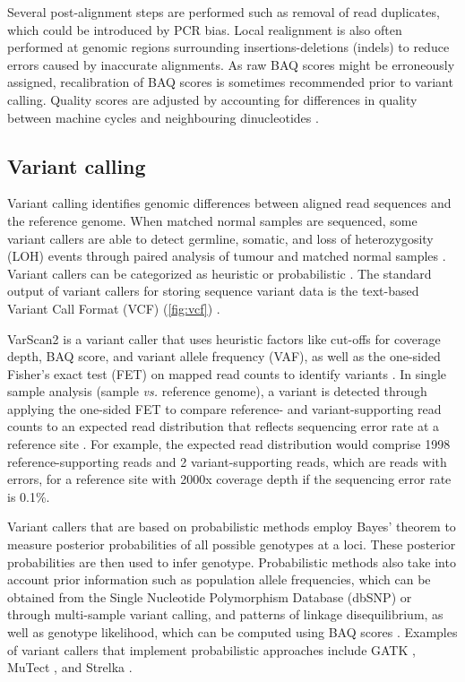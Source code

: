Several post-alignment steps are performed such as removal of read duplicates, which could be introduced by PCR bias. Local realignment is also often performed at genomic regions surrounding insertions-deletions (indels) to reduce errors caused by inaccurate alignments. As raw BAQ scores might be erroneously assigned, recalibration of BAQ scores is sometimes recommended prior to variant calling. Quality scores are adjusted by accounting for differences in quality between machine cycles and neighbouring dinucleotides \cite{Bao2014, Mielczarek2016, Nielsen2011a, Oliver2015}.

\subsection{Variant calling}

Variant calling identifies genomic differences between aligned read sequences and the reference genome. When matched normal samples are sequenced, some variant callers are able to detect germline, somatic, and loss of heterozygosity (\acs{LOH}) events through paired analysis of tumour and matched normal samples \cite{Koboldt2013}. Variant callers can be categorized as heuristic or probabilistic \cite{Mielczarek2016, Pabinger2014, Bao2014}. The standard output of variant callers for storing sequence variant data is the text-based Variant Call Format (\acs{VCF}) (\autoref{fig:vcf}) \cite{Danecek2011}.

VarScan2 is a variant caller that uses heuristic factors like cut-offs for coverage depth, BAQ score, and variant allele frequency (\acs{VAF}), as well as the one-sided Fisher's exact test (\acs{FET}) on mapped read counts to identify variants \cite{Bao2014, Pabinger2014, Mielczarek2016, Koboldt2013, Koboldt2012}. In single sample analysis (sample \textit{vs.} reference genome), a variant is detected through applying the one-sided FET to compare reference- and variant-supporting read counts to an expected read distribution that reflects sequencing error rate at a reference site \cite{Koboldt2013, Koboldt2012}. For example, the expected read distribution would comprise 1998 reference-supporting reads and 2 variant-supporting reads, which are reads with errors, for a reference site with 2000x coverage depth if the sequencing error rate is 0.1\%.

Variant callers that are based on probabilistic methods employ Bayes' theorem to measure posterior probabilities of all possible genotypes at a loci. These posterior probabilities are then used to infer genotype. Probabilistic methods also take into account prior information such as population allele frequencies, which can be obtained from the Single Nucleotide Polymorphism Database (dbSNP) or through multi-sample variant calling, and patterns of linkage disequilibrium, as well as genotype likelihood, which can be computed using BAQ scores \cite{Mielczarek2016, Nielsen2011a}. Examples of variant callers that implement probabilistic approaches include GATK \cite{Schmidt2009}, MuTect \cite{Cibulskis2013}, and Strelka \cite{Saunders2012}.

